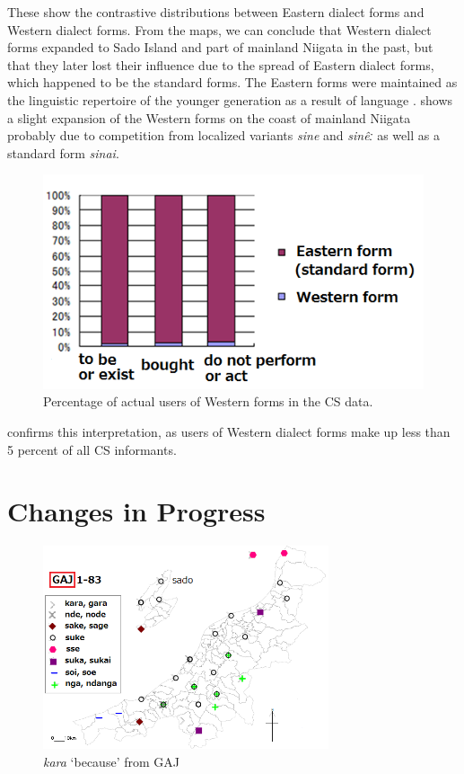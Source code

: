 \documentclass[output=paper]{LSP/langsci}
\begin{document}
These  show the contrastive distributions between Eastern dialect forms and Western dialect forms.  From the maps, we can conclude that Western dialect forms expanded to Sado Island and part of mainland Niigata in the past, but that they later lost their influence due to the spread of Eastern dialect forms, which happened to be the standard forms. The Eastern forms were maintained as the linguistic repertoire of the younger generation as a result of language .  shows a slight expansion of the Western forms on the coast of mainland Niigata probably due to  competition from localized variants \textit{sine} and \textit{sin\^{e}ː} as well as a standard form \textit{sinai}.  

\begin{figure}
\includegraphics[width=.75\textwidth]{illustrations/fuku2_fig3}
\caption{Percentage of actual users of Western forms in the \textsc{CS} data.}
\label{fig:3}
\end{figure}

 confirms this interpretation, as users of Western dialect forms make up less than 5 percent of all \textsc{CS} informants.

\section{Changes in Progress}

\begin{figure}
\includegraphics[width=0.75\textwidth]{illustrations/fuku2_fig4a}
\caption{\textit{kara} `because' from GAJ}
\label{fig:4a}
\end{figure}
\end{document}

